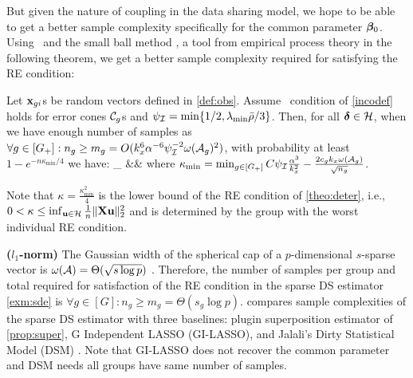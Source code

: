 But given the nature of coupling in the data sharing model, we hope to be able to get a better sample complexity specifically for the common parameter $\boldsymbol{\beta}_0$.
Using \ds\ and the small ball method \cite{mend15}, a tool from empirical process theory in the following theorem, we get a better sample complexity required for satisfying the RE condition:
\begin{theorem}
	\label{theo:re}
	Let $\mathbf{x}_{gi}$s	be random vectors defined in \cref{def:obs}.
	Assume \ds\ condition of \cref{incodef} holds for error cones $\cC_g$s and $\rinc=\min\{1/2, \lamin\ratio/3\}$.
	Then, for all $\ddelta \in \cH$, when we have enough number of samples as $\forall g \in [G_+]: n_g \geq m_g = O(k_x^6 \alpha^{-6} \rinc^{-2} \omega(\cA_g)^2)$, with probability at least $1 - e^{-n \kappa_{\min}/4}$  we have:
	\be
	\nr
	\inf_{\ddelta \in \cH}   &\geq& 
	\ee
	where $\kappa_{\min} = \min_{g\in [G_+]} C \rinc \frac{\alpha^3}{k_x^2}  - \frac{2 c_g k_x \omega(\cA_g)}{\sqrt{n_g}}$. 
\end{theorem}

\begin{remark}
	Note that $\kappa = \frac{\kappa_{\min}^2}{4}$ is the lower bound of the RE condition of \cref{theo:deter}, i.e., $0 < \kappa \leq \inf_{\u \in \cH} \frac{1}{n} \norm{\X \u}{2}^2$ and is determined by the group with the worst individual RE condition. 
\end{remark}

\begin{example}
	{\bf ($l_1$-norm)} The Gaussian width of the spherical cap of a $p$-dimensional $s$-sparse vector is $\omega(\cA) = \Theta(\sqrt{s\log p})$ \cite{banerjee14, vershynin2018high}. Therefore, the number of samples per group and total required for satisfaction of the RE condition in the sparse DS estimator \cref{exm:sde} is $\forall g \in [G]: n_g \geq m_g = \Theta(s_g \log p)$. 
	 compares sample complexities of the sparse DS estimator with three baselines: plugin superposition estimator of \cref{prop:super}, G Independent LASSO (GI-LASSO), and Jalali's Dirty Statistical Model (DSM) \cite{jrsr10}. Note that GI-LASSO does not recover the common parameter and DSM needs all groups have same number of samples. %
\end{example}

